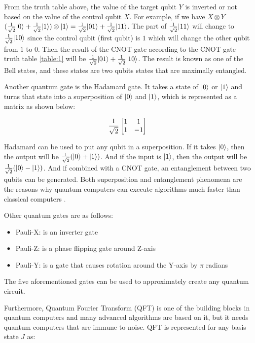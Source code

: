 \documentclass[12pt,a4paper]{article}
\DeclarePairedDelimiter\ket{\lvert}{\rangle}
\begin{document}
	From the truth table above, the value of the target qubit $Y$ is inverted or not based on the value of the control qubit $X$. For example, if we have $X \otimes Y =$ $ (\frac{1}{\sqrt2}\ket{0} + \frac{1}{\sqrt2}\ket{1}) \otimes \ket{1} =  \frac{1}{\sqrt2}\ket{01} + \frac{1}{\sqrt2}\ket{11}$.  The part of $\frac{1}{\sqrt2}\ket{11}$ will change to $\frac{1}{\sqrt2}\ket{10}$ since the control qubit (first qubit) is $1$ which will change the other qubit from $1$ to $0$. Then the result of the CNOT gate according to the CNOT gate truth table \ref{table:1} will be $ \frac{1}{\sqrt2}\ket{01} + \frac{1}{\sqrt2}\ket{10}$. The result is known as one of the Bell states, and these states are two qubits states that are maximally entangled.
	
	Another quantum gate is the Hadamard gate. It takes a state of $\ket{0}$ or $\ket{1}$ and turns that state into a superposition of $\ket{0}$ and $\ket{1}$, which is represented as a matrix as shown below:
	
	\begin{equation}
		\label{eqn:equation1}
		\frac{1}{\sqrt{2}} \begin{bmatrix*}
			1 & 1\\ 1 & -1
		\end{bmatrix*}\\
	\end{equation}
	
	Hadamard can be used to put any qubit in a superposition. If it takes $\ket{0}$, then the output will be 
	$\frac{1}{\sqrt{2}} (\ket{0} +\ket{1})$. And if the input is $\ket{1}$, then the output will be $\frac{1}{\sqrt{2}} (\ket{0} -\ket{1})$. And if combined with a CNOT gate, an entanglement between two qubits can be generated. Both superposition and entanglement phenomena are the reasons why quantum computers can execute algorithms much faster than classical computers \cite{9357505}.
	
	Other quantum gates are as follows:
	\begin{itemize}
		\item Pauli-X: is an inverter gate
		\item Pauli-Z: is a phase flipping gate around Z-axis
		\item Pauli-Y: is a gate that causes rotation around the Y-axis by $\pi$ radians
	\end{itemize}
	The five aforementioned gates can be used to approximately create any quantum circuit. 
	
	Furthermore, Quantum Fourier Transform (QFT) is one of the building blocks in quantum computers and many advanced algorithms are based on it, but it needs quantum computers that are immune to noise. QFT is represented for any basis state $J$ as:
	
\end{document}
